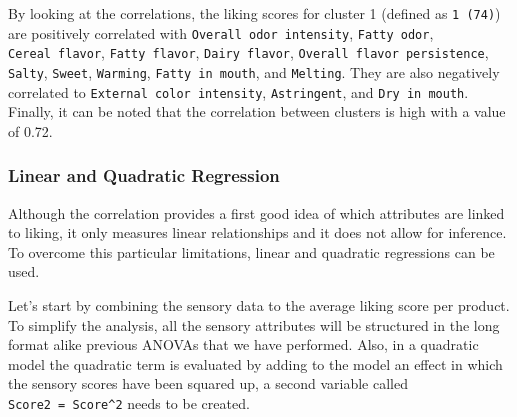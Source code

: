 \documentclass[
]{book}
\begin{document}
By looking at the correlations, the liking scores for cluster 1 (defined as \texttt{1\ (74)}) are positively correlated with \texttt{Overall\ odor\ intensity}, \texttt{Fatty\ odor}, \texttt{Cereal\ flavor}, \texttt{Fatty\ flavor}, \texttt{Dairy\ flavor}, \texttt{Overall\ flavor\ persistence}, \texttt{Salty}, \texttt{Sweet}, \texttt{Warming}, \texttt{Fatty\ in\ mouth}, and \texttt{Melting}. They are also negatively correlated to \texttt{External\ color\ intensity}, \texttt{Astringent}, and \texttt{Dry\ in\ mouth}.
Finally, it can be noted that the correlation between clusters is high with a value of 0.72.

\hypertarget{linear-and-quadratic-regression}{%
\subsubsection{Linear and Quadratic Regression}\label{linear-and-quadratic-regression}}

Although the correlation provides a first good idea of which attributes are linked to liking, it only measures linear relationships and it does not allow for inference. To overcome this particular limitations, linear and quadratic regressions can be used.

Let's start by combining the sensory data to the average liking score per product. To simplify the analysis, all the sensory attributes will be structured in the long format alike previous ANOVAs that we have performed. Also, in a quadratic model the quadratic term is evaluated by adding to the model an effect in which the sensory scores have been squared up, a second variable called \texttt{Score2\ =\ Score\^{}2} needs to be created.
\end{document}
